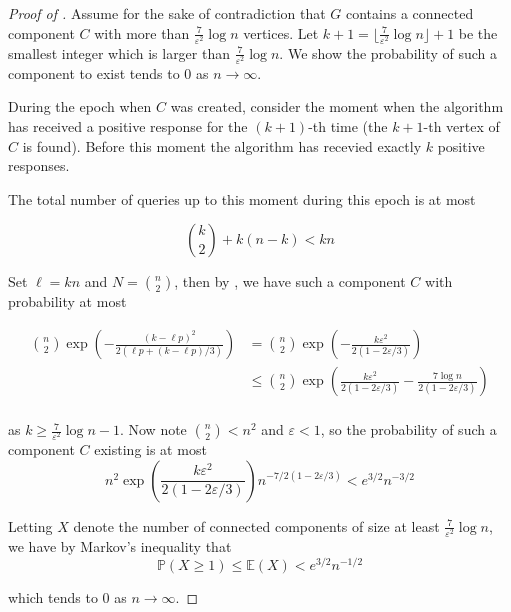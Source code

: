 \documentclass{article}
\begin{document}
\begin{proof}[Proof of ]
    Assume for the sake of contradiction that $G$ contains a connected component $C$ with more than $\frac{7}{\varepsilon^2}\log n$ vertices.  Let $k+1=\lfloor \frac{7}{\varepsilon^2}\log n \rfloor + 1$ be the smallest integer which is larger than $\frac{7}{\varepsilon^2}\log n$. We show the probability of such a component to exist tends to $0$ as $n\to \infty$.  

    \medskip

    During the epoch when $C$ was created, consider the moment when the algorithm has received a positive response for the $(k+1)$-th time (the $k+1$-th vertex of $C$ is found). 
    Before this moment the algorithm has recevied exactly $k$ positive responses.  

    The total number of queries up to this moment during this epoch is at most

    \begin{equation*}
        \binom{k}{2} + k(n-k) < kn
    \end{equation*}

    Set $\ell = kn$ and $N=\binom{n}{2}$, then by , we have such a component $C$ with probability at most

    \begin{align*}
        \binom{n}{2} \exp \left( -\frac{(k-\ell p)^2}{2(\ell p + (k-\ell p)/3)} \right) &= \binom{n}{2} \exp\left(-\frac{k\varepsilon^2}{2(1-2\varepsilon/3)}\right) \\
        &\leq \binom{n}{2} \exp\left(\frac{k\varepsilon^2}{2(1-2\varepsilon/3)} - \frac{7 \log n}{2 (1-2\varepsilon/3)}\right) \\
    \end{align*}

    as $k\geq \frac{7}{\varepsilon^2}\log n - 1$. Now note $\binom{n}{2} < n^2$ and $\varepsilon<1$, so the probability of such a component $C$ existing is at most
    \begin{equation*}
        n^2 \exp\left(\frac{k\varepsilon^2}{2(1-2\varepsilon/3)}\right) n^{-7/2(1-2\varepsilon/3)} < e^{3/2} n^{-3/2}
    \end{equation*}

    Letting $X$ denote the number of connected components of size at least $\frac{7}{\varepsilon^2}\log n$, we have by Markov's inequality that
    \begin{equation*}
        \mathbb{P}(X\geq 1) \leq \mathbb{E}(X) < e^{3/2} n^{-1/2}
    \end{equation*}

    which tends to $0$ as $n\to \infty$.
\end{proof}
\end{document}

